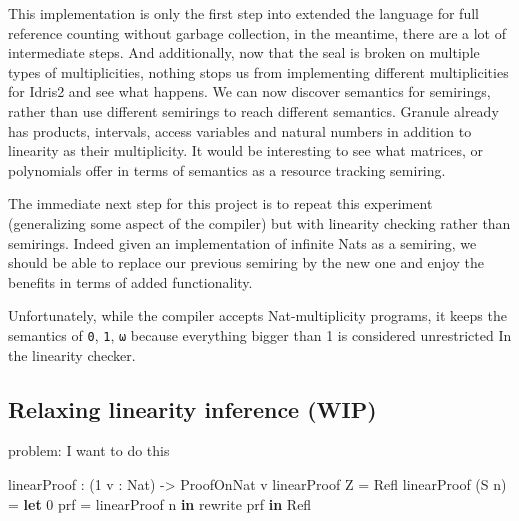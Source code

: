 \documentclass[
]{article}
\newenvironment{Shaded}{}{}
\newcommand{\DataTypeTok}[1]{\textcolor[rgb]{0.56,0.13,0.00}{#1}}
\newcommand{\DecValTok}[1]{\textcolor[rgb]{0.25,0.63,0.44}{#1}}
\newcommand{\KeywordTok}[1]{\textcolor[rgb]{0.00,0.44,0.13}{\textbf{#1}}}
\newcommand{\NormalTok}[1]{#1}
\newcommand{\OperatorTok}[1]{\textcolor[rgb]{0.40,0.40,0.40}{#1}}
\newcommand{\OtherTok}[1]{\textcolor[rgb]{0.00,0.44,0.13}{#1}}
\begin{document}
This implementation is only the first step into extended the language
for full reference counting without garbage collection, in the meantime,
there are a lot of intermediate steps. And additionally, now that the
seal is broken on multiple types of multiplicities, nothing stops us
from implementing different multiplicities for Idris2 and see what
happens. We can now discover semantics for semirings, rather than use
different semirings to reach different semantics. Granule already has
products, intervals, access variables and natural numbers in addition to
linearity as their multiplicity. It would be interesting to see what
matrices, or polynomials offer in terms of semantics as a resource
tracking semiring.

The immediate next step for this project is to repeat this experiment
(generalizing some aspect of the compiler) but with linearity checking
rather than semirings. Indeed given an implementation of infinite Nats
as a semiring, we should be able to replace our previous semiring by the
new one and enjoy the benefits in terms of added functionality.

Unfortunately, while the compiler accepts Nat-multiplicity programs, it
keeps the semantics of \texttt{0}, \texttt{1}, \texttt{ω} because
everything bigger than 1 is considered unrestricted In the linearity
checker.

\hypertarget{relaxing-linearity-inference-wip}{%
\subsection{Relaxing linearity inference
(WIP)}\label{relaxing-linearity-inference-wip}}

problem: I want to do this

\begin{Shaded}
\begin{Highlighting}[]
\NormalTok{linearProof }\OperatorTok{:}\NormalTok{ (}\DecValTok{1}\NormalTok{ v }\OperatorTok{:} \DataTypeTok{Nat}\NormalTok{) }\OtherTok{{-}\textgreater{}} \DataTypeTok{ProofOnNat}\NormalTok{ v}
\NormalTok{linearProof }\DataTypeTok{Z} \OtherTok{=} \DataTypeTok{Refl} 
\NormalTok{linearProof (}\DataTypeTok{S}\NormalTok{ n) }\OtherTok{=} \KeywordTok{let} \DecValTok{0}\NormalTok{ prf }\OtherTok{=}\NormalTok{ linearProof n }\KeywordTok{in} 
\NormalTok{                        rewrite prf }\KeywordTok{in} \DataTypeTok{Refl}
\end{Highlighting}
\end{Shaded}
\end{document}
